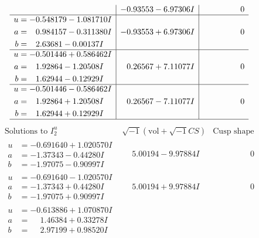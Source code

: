 \documentclass[1p]{elsarticle_modified}
\theoremstyle{definition}
\newcommand{\I}{\sqrt{-1}}
\begin{document}
$$\begin{array}{c|c|c}
 & -0.93553 - 6.97306 I & \phantom{-0.000000 } 0 \\ \hline\begin{aligned}
u &= -0.548179 - 1.081710 I \\
a &= \phantom{-}0.984157 - 0.311380 I \\
b &= \phantom{-}2.63681 - 0.00137 I\end{aligned}
 & -0.93553 + 6.97306 I & \phantom{-0.000000 } 0 \\ \hline\begin{aligned}
u &= -0.501446 + 0.586462 I \\
a &= \phantom{-}1.92864 - 1.20508 I \\
b &= \phantom{-}1.62944 - 0.12929 I\end{aligned}
 & \phantom{-}0.26567 + 7.11077 I & \phantom{-0.000000 } 0 \\ \hline\begin{aligned}
u &= -0.501446 - 0.586462 I \\
a &= \phantom{-}1.92864 + 1.20508 I \\
b &= \phantom{-}1.62944 + 0.12929 I\end{aligned}
 & \phantom{-}0.26567 - 7.11077 I & \phantom{-0.000000 } 0\\
 \hline 
 \end{array}$$\newpage$$\begin{array}{c|c|c}  
\text{Solutions to }I^u_{2}& \I (\text{vol} + \sqrt{-1}CS) & \text{Cusp shape}\\
 \hline 
\begin{aligned}
u &= -0.691640 + 1.020570 I \\
a &= -1.37343 - 0.44280 I \\
b &= -1.97075 - 0.90997 I\end{aligned}
 & \phantom{-}5.00194 - 9.97884 I & \phantom{-0.000000 } 0 \\ \hline\begin{aligned}
u &= -0.691640 - 1.020570 I \\
a &= -1.37343 + 0.44280 I \\
b &= -1.97075 + 0.90997 I\end{aligned}
 & \phantom{-}5.00194 + 9.97884 I & \phantom{-0.000000 } 0 \\ \hline\begin{aligned}
u &= -0.613886 + 1.070870 I \\
a &= \phantom{-}1.46384 + 0.33278 I \\
b &= \phantom{-}2.97199 + 0.98520 I\end{aligned}

\end{array}$$
\end{document}
